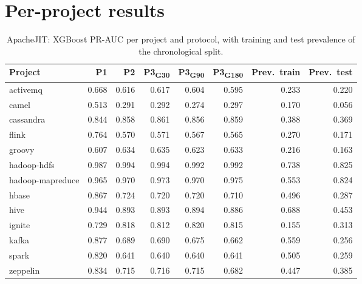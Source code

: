 \documentclass[11pt,a4paper]{article}
\begin{document}
\appendix
\section{Per-project results}\label{app:perproject}

\begin{table}[h]
\centering
\caption{ApacheJIT: XGBoost PR-AUC per project and protocol, with training and test prevalence of the chronological split.}
\label{tab:perproject}
\small
\begin{tabular}{lrrrrrrr}
\toprule
Project & P1 & P2 & P3\textsubscript{G30} & P3\textsubscript{G90} & P3\textsubscript{G180} & Prev.\ train & Prev.\ test \\
\midrule
activemq          & 0.668 & 0.616 & 0.617 & 0.604 & 0.595 & 0.233 & 0.220 \\
camel             & 0.513 & 0.291 & 0.292 & 0.274 & 0.297 & 0.170 & 0.056 \\
cassandra         & 0.844 & 0.858 & 0.861 & 0.856 & 0.859 & 0.388 & 0.369 \\
flink             & 0.764 & 0.570 & 0.571 & 0.567 & 0.565 & 0.270 & 0.171 \\
groovy            & 0.607 & 0.634 & 0.635 & 0.623 & 0.633 & 0.216 & 0.163 \\
hadoop-hdfs       & 0.987 & 0.994 & 0.994 & 0.992 & 0.992 & 0.738 & 0.825 \\
hadoop-mapreduce  & 0.965 & 0.970 & 0.973 & 0.970 & 0.975 & 0.553 & 0.824 \\
hbase             & 0.867 & 0.724 & 0.720 & 0.720 & 0.710 & 0.496 & 0.287 \\
hive              & 0.944 & 0.893 & 0.893 & 0.894 & 0.886 & 0.688 & 0.453 \\
ignite            & 0.729 & 0.818 & 0.812 & 0.820 & 0.815 & 0.155 & 0.313 \\
kafka             & 0.877 & 0.689 & 0.690 & 0.675 & 0.662 & 0.559 & 0.256 \\
spark             & 0.820 & 0.641 & 0.640 & 0.640 & 0.641 & 0.505 & 0.259 \\
zeppelin          & 0.834 & 0.715 & 0.716 & 0.715 & 0.682 & 0.447 & 0.385 \\
\bottomrule
\end{tabular}
\end{table}
\end{document}
